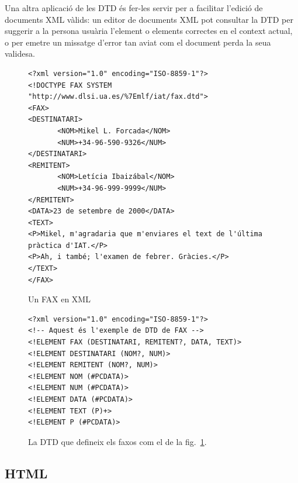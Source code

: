   Una altra aplicació de les DTD és fer-les servir per a facilitar
  l'edició de documents XML vàlids: un editor de documents XML pot
  consultar la DTD per suggerir a la persona usuària l'element o
  elements correctes en el context actual, o per emetre un missatge
  d'error tan aviat com el document perda la seua validesa.


\begin{figure}
\begin{center}
\begin{verbatim}
<?xml version="1.0" encoding="ISO-8859-1"?>
<!DOCTYPE FAX SYSTEM "http://www.dlsi.ua.es/%7Emlf/iat/fax.dtd">
<FAX>
<DESTINATARI>
       <NOM>Mikel L. Forcada</NOM>
       <NUM>+34-96-590-9326</NUM>
</DESTINATARI>
<REMITENT>
       <NOM>Letícia Ibaizábal</NOM>
       <NUM>+34-96-999-9999</NUM>
</REMITENT>
<DATA>23 de setembre de 2000</DATA>
<TEXT>
<P>Mikel, m'agradaria que m'enviares el text de l'última
pràctica d'IAT.</P>
<P>Ah, i també; l'examen de febrer. Gràcies.</P>
</TEXT>
</FAX>
\end{verbatim}
\end{center}
\caption{Un FAX en XML}
\label{fg:faxXML}
\end{figure}

\begin{figure}
\begin{center}
\begin{verbatim}
<?xml version="1.0" encoding="ISO-8859-1"?>
<!-- Aquest és l'exemple de DTD de FAX -->
<!ELEMENT FAX (DESTINATARI, REMITENT?, DATA, TEXT)>
<!ELEMENT DESTINATARI (NOM?, NUM)>
<!ELEMENT REMITENT (NOM?, NUM)>
<!ELEMENT NOM (#PCDATA)>
<!ELEMENT NUM (#PCDATA)>
<!ELEMENT DATA (#PCDATA)>
<!ELEMENT TEXT (P)+>
<!ELEMENT P (#PCDATA)>
\end{verbatim}
\end{center}
\caption{La DTD que defineix els faxos com el de la fig.~\ref{fg:faxXML}.}
\label{fg:faxDTD}
\end{figure}

\subsection{HTML}
\label{s3:HTML}


